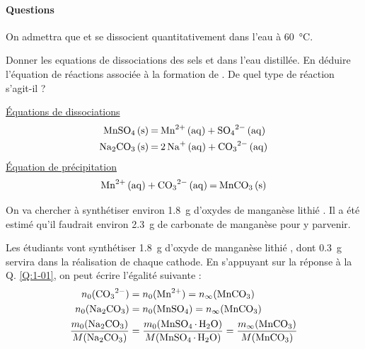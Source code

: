 \documentclass[twoside,a4paper,11pt,addpoints,answers]{exam}%
\begin{document}
\paragraph*{Questions}

On admettra que  et  se dissocient quantitativement dans l'eau à \SI{60}{\celsius}.

\begin{questions}
\question[1\half] \label{Q:1-01} {\color{purple} Donner les equations de dissociations des sels  et  dans l'eau distillée. En déduire l'équation de réactions associée à la formation de . De quel type de réaction s'agit-il ?}

\begin{mybox}
\begin{solution}[4cm]
\underline{\'{E}quations de dissociations}
\begin{align*}
\ce{MnSO4 (s) &= Mn^{2+} (aq) + SO4^{2-} (aq)} \\
\ce{Na2CO3 (s) &= 2 Na^+ (aq) + CO3^{2-} (aq)}
\end{align*}
\underline{\'{E}quation de précipitation}
\begin{align*}
\ce{Mn^{2+} (aq) + CO3^{2-} (aq) = MnCO3 (s)}
\end{align*}
\end{solution}
\end{mybox}


On va chercher à synthétiser environ \SI{1.8}{\gram} d'oxydes de manganèse lithié . Il a été estimé qu'il faudrait environ \SI{2.3}{\gram} de carbonate de manganèse  pour y parvenir.


\begin{mybox}\begin{solution}[6cm]
Les étudiants vont synthétiser \SI{1.8}{\gram} d'oxyde de manganèse lithié , dont \SI{0.3}{\gram} servira dans la réalisation de chaque cathode.
En s'appuyant sur la réponse à la Q. \ref{Q:1-01}, on peut écrire l'égalité suivante : 
\begin{align*}
n_0 (\ce{CO3^{2-}}) &= n_0 (\ce{Mn^{2+}}) = n_\infty ( \ce{MnCO3} ) \\
n_0 (\ce{Na2CO3}) &= n_0 (\ce{MnSO4}) = n_\infty ( \ce{MnCO3} ) \\
\frac{m_0 (\ce{Na2CO3})}{M (\ce{Na2CO3})} &= \frac{m_0 (\ce{MnSO4.H2O})}{M (\ce{MnSO4.H2O})} = \frac{m_\infty ( \ce{MnCO3} )}{M( \ce{MnCO3} )}
\end{align*}


\end{solution}
\end{mybox}
\end{questions}
\end{document}

